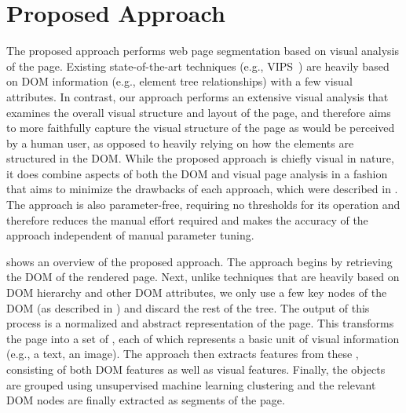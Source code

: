 \section{Proposed Approach}
\label{sec:approach}

The proposed approach performs web page segmentation 
based on visual analysis of the page.
Existing state-of-the-art techniques (e.g., VIPS~\cite{cai2003vips}) 
are heavily based on DOM information (e.g., element tree relationships) 
with a few visual attributes.
In contrast, our approach performs an extensive visual analysis that examines
the overall visual structure and layout of the page, 
and therefore aims to more faithfully capture the visual structure of the page as 
would be perceived by a human user, as opposed to heavily relying on how the 
elements are structured in the DOM. 
While the proposed approach is chiefly visual in nature,
it does combine aspects of both the DOM and visual page analysis 
in a fashion that aims to minimize the drawbacks of each approach, 
which were described in .
The approach is also parameter-free,
requiring no thresholds for its operation and therefore
reduces the manual effort required and
makes the accuracy of the approach
independent of manual parameter tuning. 

 shows an overview of the proposed approach.
The approach begins by retrieving the DOM 
of the rendered page.
Next, unlike techniques that are heavily based on DOM hierarchy and other DOM attributes, 
we only use a few key nodes of the DOM (as described in ) 
and discard the rest of the tree.
The output of this process is a normalized and abstract representation of the page.
This transforms the page into a set of \vizobjs,
each of which represents a basic unit of visual information 
(e.g., a text, an image).
The approach then extracts features from these \vizobjs,
consisting of both DOM features as well as visual features.
Finally, the objects are grouped using unsupervised machine learning clustering
and the relevant DOM nodes are finally extracted as segments of the page.

